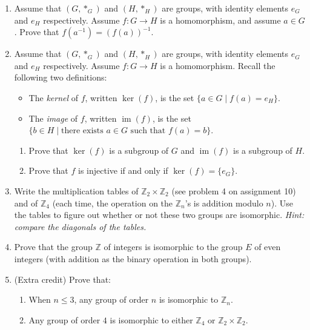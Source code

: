 \documentclass{amsart}
\theoremstyle{definition}
\newcommand{\im}{\operatorname{im}}
\begin{document}
\begin{enumerate}
\item Assume that $(G, \ast_G)$ and $(H, \ast_H)$ are groups, with identity elements $e_G$ and $e_H$ respectively. Assume $f: G \to H$ is a homomorphism, and assume $a \in G$. Prove that $f (a^{-1}) = (f (a))^{-1}$.
\item Assume that $(G, \ast_G)$ and $(H, \ast_H)$ are groups, with identity elements $e_G$ and $e_H$ respectively. Assume $f: G \to H$ is a homomorphism. Recall the following two definitions:
  \begin{itemize}
  \item The \emph{kernel} of $f$, written $\ker (f)$, is the set $\{a \in G \mid f (a) = e_H\}$.
  \item The \emph{image} of $f$, written $\im (f)$,  is the set $\{b \in H \mid \text{there exists } a \in G \text{ such that } f (a) = b\}$.
  \end{itemize}

  \begin{enumerate}
  \item Prove that $\ker (f)$ is a subgroup of $G$ and $\im (f)$ is a subgroup of $H$.
  \item Prove that $f$ is injective if and only if $\ker (f) = \{e_G\}$.
  \end{enumerate}
\item Write the multiplication tables of $\mathbb{Z}_2 \times \mathbb{Z}_2$ (see problem 4 on assignment 10) and of $\mathbb{Z}_4$ (each time, the operation on the $\mathbb{Z}_n$'s is addition modulo $n$). Use the tables to figure out whether or not these two groups are isomorphic. \emph{Hint: compare the diagonals of the tables.}
\item Prove that the group $\mathbb{Z}$ of integers is isomorphic to the group $E$ of even integers (with addition as the binary operation in both groups).
\item (Extra credit) Prove that:
  \begin{enumerate}
  \item When $n \le 3$, any group of order $n$ is isomorphic to $\mathbb{Z}_n$.
  \item Any group of order $4$ is isomorphic to either $\mathbb{Z}_4$ or $\mathbb{Z}_2 \times \mathbb{Z}_2$.
  \end{enumerate}
\end{enumerate}





\end{document}
